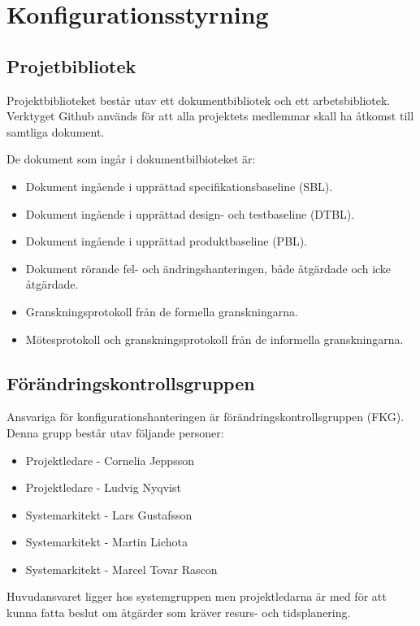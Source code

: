 \documentclass[a4paper]{article}
\begin{document}
\section{Konfigurationsstyrning}
\begin{comment}En beskrivning av konfigurationsstyrningen (CM), se kapitel 4 i röda boken. Konfigurationsstyrningen beskriver hur projektbiblioteket är organiserat och hur ändringshanteringen fungerar.


I samband med projektplanen är det också viktigt att tänka på att det i slutet av projektet skall skrivas en slutrapport. Detta betyder att man redan vid skrivandet av planen bör överväga hur slutrapporten skall se ut så att man enkelt kan stämma av med projektplanen.
\end{comment}
\subsection{Projetbibliotek}

Projektbiblioteket består utav ett dokumentbibliotek och ett arbetsbibliotek. Verktyget Github används för att alla projektets medlemmar skall ha åtkomst till samtliga dokument.

De dokument som ingår i dokumentbilbioteket är:
\begin{itemize}
\item Dokument ingående i upprättad specifikationsbaseline (SBL).
\item Dokument ingående i upprättad design- och testbaseline (DTBL).
\item Dokument ingående i upprättad produktbaseline (PBL).
\item Dokument rörande fel- och ändringshanteringen, både åtgärdade och icke åtgärdade.
\item Granskningsprotokoll från de formella granskningarna.
\item Mötesprotokoll och granskningsprotokoll från de informella granskningarna.
\end{itemize}

\subsection{Förändringskontrollsgruppen}
Ansvariga för konfigurationshanteringen är förändringskontrollsgruppen (FKG).
Denna grupp består utav följande personer:
\begin{itemize}
\item Projektledare - Cornelia Jeppsson
\item Projektledare - Ludvig Nyqvist
\item Systemarkitekt - Lars Gustafsson
\item Systemarkitekt - Martin Lichota
\item Systemarkitekt - Marcel Tovar Rascon
\end{itemize}
Huvudansvaret ligger hos systemgruppen men projektledarna är med för att kunna fatta beslut om åtgärder som kräver resurs- och tidsplanering.
\end{document}
